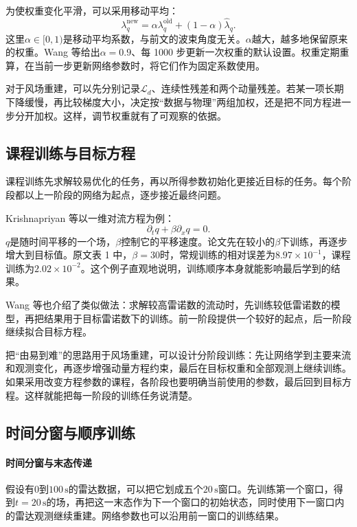 为使权重变化平滑，可以采用移动平均：
\begin{equation}
 \lambda_q^{\mathrm{new}}
 =\alpha\lambda_q^{\mathrm{old}}+(1-\alpha)\widehat\lambda_q.
 \label{eq:pinn-gradient-balance-ema}
\end{equation}
这里$\alpha\in[0,1)$是移动平均系数，与前文的波束角度无关。$\alpha$越大，越多地保留原来的权重。Wang 等给出$\alpha=0.9$、每 1000 步更新一次权重的默认设置\cite{wang2023expert}。权重定期重算，在当前一步更新网络参数时，将它们作为固定系数使用。

对于风场重建，可以先分别记录$\mathcal L_d$、连续性残差和两个动量残差。若某一项长期下降缓慢，再比较梯度大小，决定按“数据与物理”两组加权，还是把不同方程进一步分开加权。这样，调节权重就有了可观察的依据。

\subsection{课程训练与目标方程}
课程训练先求解较易优化的任务，再以所得参数初始化更接近目标的任务。每个阶段都以上一阶段的网络为起点，逐步接近最终问题。

Krishnapriyan 等以一维对流方程为例：
\begin{equation}
 \partial_tq+\beta\partial_xq=0.
 \label{eq:pinn-curriculum-convection}
\end{equation}
$q$是随时间平移的一个场，$\beta$控制它的平移速度。论文先在较小的$\beta$下训练，再逐步增大到目标值。原文表 1 中，$\beta=30$时，常规训练的相对误差为$8.97\times10^{-1}$，课程训练为$2.02\times10^{-2}$\cite{krishnapriyan2021failure}。这个例子直观地说明，训练顺序本身就能影响最后学到的结果。

Wang 等也介绍了类似做法：求解较高雷诺数的流动时，先训练较低雷诺数的模型，再把结果用于目标雷诺数下的训练\cite{wang2023expert}。前一阶段提供一个较好的起点，后一阶段继续拟合目标方程。

把“由易到难”的思路用于风场重建，可以设计分阶段训练：先让网络学到主要来流和观测变化，再逐步增强动量方程约束，最后在目标权重和全部观测上继续训练。如果采用改变方程参数的课程，各阶段也要明确当前使用的参数，最后回到目标方程。这样就能把每一阶段的训练任务说清楚。

\subsection{时间分窗与顺序训练}
\paragraph{时间分窗与末态传递}
假设有$0$到$100\,\mathrm{s}$的雷达数据，可以把它划成五个$20\,\mathrm{s}$窗口。先训练第一个窗口，得到$t=20\,\mathrm{s}$的场，再把这一末态作为下一个窗口的初始状态，同时使用下一窗口内的雷达观测继续重建。网络参数也可以沿用前一窗口的训练结果。

